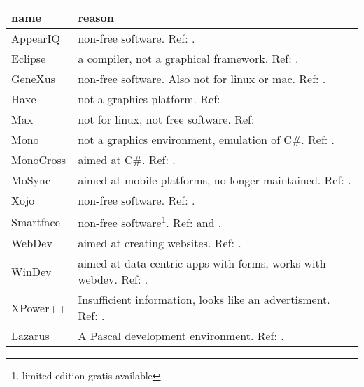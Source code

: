\begin{center}
    \begin{tabular}{|p{7em}|p{25em}|}
	\hline
	{\bf name} & {\bf reason}\\\hline
	AppearIQ & non-free software. Ref: \cite{appear:appeariq}.\\
	Eclipse & a compiler, not a graphical framework. Ref: \cite{wiki:eclipse}.\\
	GeneXus & non-free software. Also not for linux
		    or mac. Ref: \cite{wiki:genexus}. \\
	Haxe & not a graphics platform. Ref: \cite{wiki:haxe}\\
	Max & not for linux, not free software. Ref: \cite{wiki:max}\\
	Mono & not a graphics environment, emulation
		of C\#. Ref: \cite{wiki:mono}.\\
	MonoCross & aimed at C\#. Ref: \cite{wiki:monocross}.\\
	MoSync & aimed at mobile platforms, no longer maintained. Ref: \cite{wiki:mosync}.\\
	Xojo & non-free software. Ref: \cite{wiki:xojo}.\\
	Smartface & non-free software\footnote{limited edition gratis available}. Ref: \cite{wiki:smartface} and \cite{smartface:license}.\\
	WebDev & aimed at creating websites. Ref: \cite{wiki:webdev}.\\
	WinDev & aimed at data centric apps with forms, works with webdev. Ref: \cite{wiki:windev}.\\
	XPower++ & Insufficient information, looks like an advertisment. Ref: \cite{wiki:xpower++}.\\
	Lazarus & A Pascal development environment. Ref: \cite{wiki:lazarus}.\\
	\hline
    \end{tabular}
\end{center}

